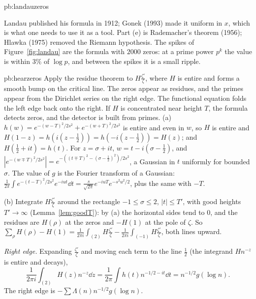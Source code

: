 \begin{solution}{pb:landauzeros}

\leads Landau published his formula in 1912; Gonek (1993) made it uniform in $x$, which is what one needs to use it as a tool. Part (e) is Rademacher's theorem (1956); Hlawka (1975)
removed the Riemann hypothesis. The spikes of Figure~\ref{fig:landau} are the formula with $2000$ zeros: at a prime power $p^k$ the value is within $3\%$ of $\log p$, and between the
spikes it is a small ripple.
\end{solution}

\begin{solution}{pb:hearzeros}
\idea Apply the residue theorem to $H\frac{\zeta'}\zeta$, where $H$ is entire and forms a smooth bump on the critical line. The zeros appear as residues, and the primes appear from the Dirichlet series on the right edge. The functional equation folds the left edge back onto the right. If $H$ is concentrated near height $T$, the formula detects zeros, and the detector is built from primes.
\writeup (a) $h(w)=e^{-(w-T)^2/2s^2}+e^{-(w+T)^2/2s^2}$ is entire and even in $w$, so $H$ is entire and $H(1-z)=h(i(z-\frac12))=h(-i(z-\frac12))=H(z)$; and $H(\frac12+it)=h(t)$.
For $z=\sigma+it$, $w=t-i(\sigma-\frac12)$, and $|e^{-(w\mp T)^2/2s^2}|=e^{-((t\mp T)^2-(\sigma-\frac12)^2)/2s^2}$, a Gaussian in $t$ uniformly for bounded $\sigma$. The value of $g$ is the
Fourier transform of a Gaussian: $\frac1{2\pi}\int e^{-(t-T)^2/2s^2}e^{-iut}\dd t=\frac s{\sqrt{2\pi}}e^{-iuT}e^{-s^2u^2/2}$, plus the same with $-T$.

(b) Integrate $H\frac{\zeta'}\zeta$ around the rectangle $-1\le\sigma\le2$, $|t|\le T'$, with good heights $T'\to\infty$ (Lemma~\ref{lem:goodT}): by (a) the horizontal sides tend to $0$,
and the residues are $H(\rho)$ at the zeros and $-H(1)$ at the pole of $\zeta$. So
$\sum_\rho H(\rho)-H(1)=\frac1{2\pi i}\int_{(2)}H\frac{\zeta'}\zeta-\frac1{2\pi i}\int_{(-1)}H\frac{\zeta'}\zeta$, both lines upward.

\emph{Right edge.} Expanding $\frac{\zeta'}\zeta$ and moving each term to the line $\frac12$ (the integrand $Hn^{-z}$ is entire and decays),
\[
\frac1{2\pi i}\int_{(2)}H(z)n^{-z}\dd z=\frac1{2\pi}\int h(t)n^{-1/2-it}\dd t=n^{-1/2}g(\log n).
\]
The right edge is $-\sum\Lambda(n)n^{-1/2}g(\log n)$.


\end{solution}
